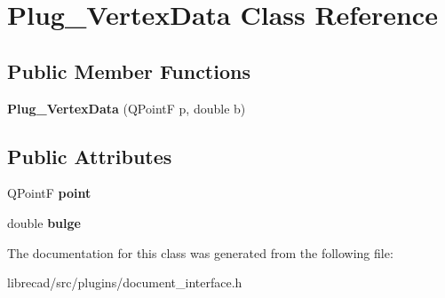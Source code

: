 \hypertarget{classPlug__VertexData}{\section{Plug\-\_\-\-Vertex\-Data Class Reference}
\label{classPlug__VertexData}
}
\subsection*{Public Member Functions}
\begin{DoxyCompactItemize}
\item 
\hypertarget{classPlug__VertexData_a7d1202998d385584434e43dddb785fe8}{{\bfseries Plug\-\_\-\-Vertex\-Data} (Q\-Point\-F p, double b)}\label{classPlug__VertexData_a7d1202998d385584434e43dddb785fe8}

\end{DoxyCompactItemize}
\subsection*{Public Attributes}
\begin{DoxyCompactItemize}
\item 
\hypertarget{classPlug__VertexData_a32e1801f8ee1aa2e28648397a7789415}{Q\-Point\-F {\bfseries point}}\label{classPlug__VertexData_a32e1801f8ee1aa2e28648397a7789415}

\item 
\hypertarget{classPlug__VertexData_aa3d8dfb8f1a8437ab7e2dc089c25def3}{double {\bfseries bulge}}\label{classPlug__VertexData_aa3d8dfb8f1a8437ab7e2dc089c25def3}

\end{DoxyCompactItemize}


The documentation for this class was generated from the following file\-:\begin{DoxyCompactItemize}
\item 
librecad/src/plugins/document\-\_\-interface.\-h\end{DoxyCompactItemize}
